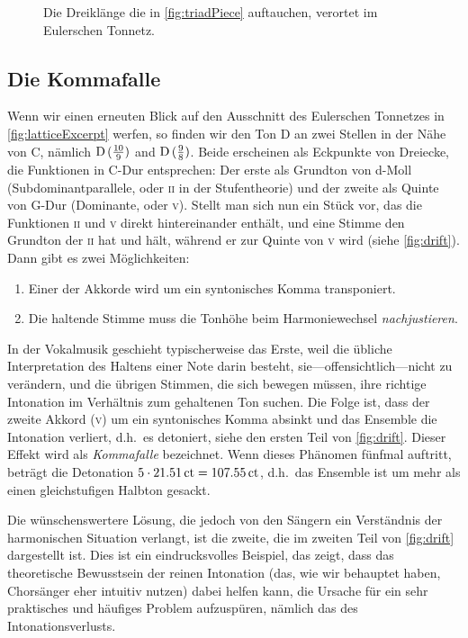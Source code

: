 \documentclass[british,11pt]{scrartcl}
\begin{document}
\begin{figure}
  
  \caption{Die Dreiklänge die in \cref{fig:triadPiece} auftauchen, verortet im
  	Eulerschen Tonnetz.}\label{fig:chordsLattice}
\end{figure}

\subsection{Die Kommafalle}

Wenn wir einen erneuten Blick auf den Ausschnitt des Eulerschen Tonnetzes in \cref{fig:latticeExcerpt} werfen, so finden wir den Ton D an zwei Stellen in der Nähe von C, nämlich \naturalm $\text{D}\,(\frac{10}9)$ and $\text{D}\,(\frac98)$. Beide erscheinen als Eckpunkte von Dreiecke, die Funktionen in C-Dur entsprechen: Der erste als Grundton von d-Moll (Subdominantparallele, oder \textsc{ii} in der Stufentheorie) und der zweite als Quinte von G-Dur (Dominante, oder \textsc{v}). Stellt man sich nun ein Stück vor, das die Funktionen \textsc{ii} und \textsc{v} direkt hintereinander enthält, und eine Stimme den Grundton der \textsc{ii} hat und hält, während er zur Quinte von \textsc{v} wird (siehe \cref{fig:drift}). Dann gibt es zwei Möglichkeiten:


\begin{enumerate}[itemsep=0em]
\item Einer der Akkorde wird um ein syntonisches Komma transponiert.
\item Die haltende Stimme muss die Tonhöhe beim Harmoniewechsel 
  \emph{nachjustieren}.
\end{enumerate}%
%
In der Vokalmusik geschieht typischerweise das Erste, weil die übliche
Interpretation des Haltens einer Note darin besteht, sie—offensichtlich—nicht zu
verändern, und die übrigen Stimmen, die sich bewegen müssen, ihre richtige
Intonation im Verhältnis zum gehaltenen Ton suchen. Die Folge ist, dass der
zweite Akkord (\textsc{v}) um ein syntonisches Komma absinkt und das Ensemble
die Intonation verliert, d.h.\ es detoniert, siehe den ersten Teil von
\cref{fig:drift}. Dieser Effekt wird als \emph{Kommafalle} bezeichnet. Wenn
dieses Phänomen fünfmal auftritt, beträgt die Detonation
$5\cdot 21.51\,\mathrm{ct}=107.55\,\mathrm{ct}$, d.h.\ das Ensemble ist um mehr als
einen gleichstufigen Halbton gesackt.

Die wünschenswertere Lösung, die jedoch von den Sängern ein Verständnis der
harmonischen Situation verlangt, ist die zweite, die im zweiten Teil von
\cref{fig:drift} dargestellt ist. Dies ist ein eindrucksvolles Beispiel, das
zeigt, dass das theoretische Bewusstsein der reinen Intonation (das, wie wir
behauptet haben, Chorsänger eher intuitiv nutzen) dabei helfen kann, die Ursache
für ein sehr praktisches und häufiges Problem aufzuspüren, nämlich das des
Intonationsverlusts.
\end{document}
